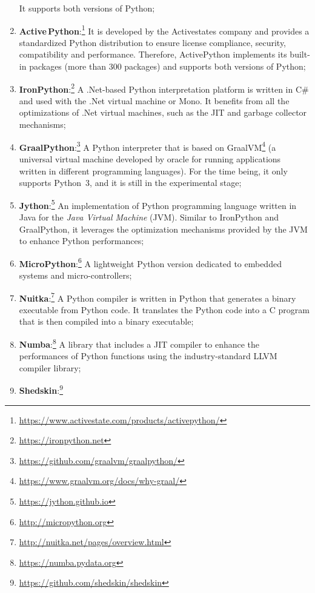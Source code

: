 \begin{enumerate}
            It supports both versions of Python;
      \item \textbf{Active\,Python}:\footnote{\url{https://www.activestate.com/products/activepython/}}
            It is developed by the Activestates company and provides a standardized Python distribution to ensure license compliance, security, compatibility and performance.
            Therefore, ActivePython implements its built-in packages (more than 300 packages) and supports both versions of Python;
      \item \textbf{IronPython}:\footnote{\url{https://ironpython.net}}
            A .Net-based Python interpretation platform is written in C\# and used with the .Net virtual machine or Mono.
            It benefits from all the optimizations of .Net virtual machines, such as the JIT and garbage collector mechanisms;
      \item \textbf{GraalPython}:\footnote{\url{https://github.com/graalvm/graalpython/}}
            A Python interpreter that is based on GraalVM\footnote{\url{https://www.graalvm.org/docs/why-graal/}} (a universal virtual machine developed by oracle for running applications written in different programming languages).
            For the time being, it only supports Python~3, and it is still in the experimental stage;
      \item \textbf{Jython}:\footnote{\url{https://jython.github.io}}
            An implementation of Python programming language written in Java for the \emph{Java Virtual Machine} (JVM).
            Similar to IronPython and GraalPython, it leverages the optimization mechanisms provided by the JVM to enhance Python performances;
      \item \textbf{MicroPython}:\footnote{\url{http://micropython.org}}
            A lightweight Python version dedicated to embedded systems and micro-controllers;
      \item \textbf{Nuitka}:\footnote{\url{http://nuitka.net/pages/overview.html}}
            A Python compiler is written in Python that generates a binary executable from Python code.
            It translates the Python code into a C program that is then compiled into a binary executable;
      \item \textbf{Numba}:\footnote{\url{https://numba.pydata.org}}
            A library that includes a JIT compiler to enhance the performances of Python functions using the industry-standard LLVM compiler library;
      \item \textbf{Shedskin}:\footnote{\url{https://github.com/shedskin/shedskin}}

\end{enumerate}
